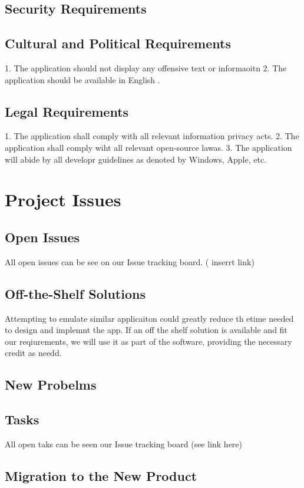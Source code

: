 \documentclass{article}
\begin{document}
\subsection{Security Requirements}
\subsection{Cultural and Political Requirements}
1. The application should not display any offensive text or informaoitn 
2. The application should be available in English . 

\subsection{Legal Requirements}
1. The application shall comply with all relevant information privacy acts.
2. The application shall comply wiht all relevant open-source lawas. 
3.  The application will abide by all developr guidelines as denoted by Windows, Apple, etc. 


\newpage
\section{Project Issues }
\subsection{Open Issues}
All open issues can be see on our Issue tracking board. ( inserrt link) 
\subsection{Off-the-Shelf Solutions}
Attempting to emulate similar applicaiton could greatly reduce th etime needed to design and implemnt the app. If an off the shelf solution is available and fit our reqiurements, we will use it as part of the software, providing the necessary credit as needd. 
\subsection{New Probelms}
\subsection{Tasks}
All open taks can be seen our Issue tracking board (see link here)
\subsection{Migration to the New Product}
\end{document}
